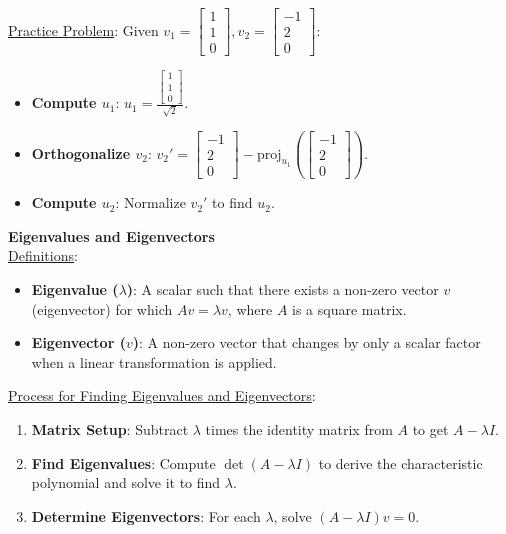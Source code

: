 \documentclass[8pt, a4paper, landscape]{extarticle} %
\begin{document}
\begin{multicols*}{4}
  \underline{Practice Problem}:
  Given \( v_1 = \begin{bmatrix} 1 \\ 1 \\ 0 \end{bmatrix}, v_2 = \begin{bmatrix} -1 \\ 2 \\ 0 \end{bmatrix} \):
  \begin{itemize}
    \item \textbf{Compute \( u_1 \)}: \( u_1 = \frac{\begin{bmatrix} 1 \\ 1 \\ 0 \end{bmatrix}}{\sqrt{2}} \).
    \item \textbf{Orthogonalize \( v_2 \)}: \( v_2' = \begin{bmatrix} -1 \\ 2 \\ 0 \end{bmatrix} - \text{proj}_{u_1}(\begin{bmatrix} -1 \\ 2 \\ 0 \end{bmatrix}) \).
    \item \textbf{Compute \( u_2 \)}: Normalize \( v_2' \) to find \( u_2 \).
  \end{itemize}



  \textbf{Eigenvalues and Eigenvectors}\\
  \underline{Definitions}:
  \begin{itemize}
    \item \textbf{Eigenvalue (\(\lambda\))}: A scalar such that there exists a non-zero vector \( v \) (eigenvector) for which \( Av = \lambda v \), where \( A \) is a square matrix.
    \item \textbf{Eigenvector (\(v\))}: A non-zero vector that changes by only a scalar factor when a linear transformation is applied.
  \end{itemize}

  \underline{Process for Finding Eigenvalues and Eigenvectors}:
  \begin{enumerate}
    \item \textbf{Matrix Setup}: Subtract \(\lambda\) times the identity matrix from \( A \) to get \( A - \lambda I \).
    \item \textbf{Find Eigenvalues}: Compute \(\det(A - \lambda I)\) to derive the characteristic polynomial and solve it to find \(\lambda\).
    \item \textbf{Determine Eigenvectors}: For each \(\lambda\), solve \( (A - \lambda I)v = 0 \).
  \end{enumerate}


\end{multicols*}
\end{document}
